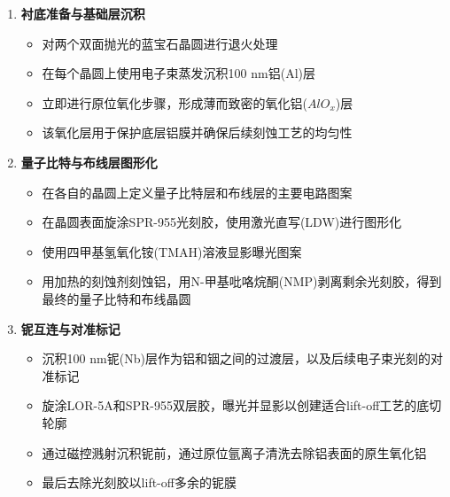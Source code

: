 \documentclass[11pt,a4paper]{article}
\begin{document}
\begin{enumerate}
    \item \textbf{衬底准备与基础层沉积}
    \begin{itemize}
        \item 对两个双面抛光的蓝宝石晶圆进行退火处理
        \item 在每个晶圆上使用电子束蒸发沉积100 nm铝(Al)层
        \item 立即进行原位氧化步骤，形成薄而致密的氧化铝($AlO_x$)层
        \item 该氧化层用于保护底层铝膜并确保后续刻蚀工艺的均匀性
    \end{itemize}
    
    \item \textbf{量子比特与布线层图形化}
    \begin{itemize}
        \item 在各自的晶圆上定义量子比特层和布线层的主要电路图案
        \item 在晶圆表面旋涂SPR-955光刻胶，使用激光直写(LDW)进行图形化
        \item 使用四甲基氢氧化铵(TMAH)溶液显影曝光图案
        \item 用加热的刻蚀剂刻蚀铝，用N-甲基吡咯烷酮(NMP)剥离剩余光刻胶，得到最终的量子比特和布线晶圆
    \end{itemize}
    
    \item \textbf{铌互连与对准标记}
    \begin{itemize}
        \item 沉积100 nm铌(Nb)层作为铝和铟之间的过渡层，以及后续电子束光刻的对准标记
        \item 旋涂LOR-5A和SPR-955双层胶，曝光并显影以创建适合lift-off工艺的底切轮廓
        \item 通过磁控溅射沉积铌前，通过原位氩离子清洗去除铝表面的原生氧化铝
        \item 最后去除光刻胶以lift-off多余的铌膜
    \end{itemize}
    

\end{enumerate}
\end{document}
